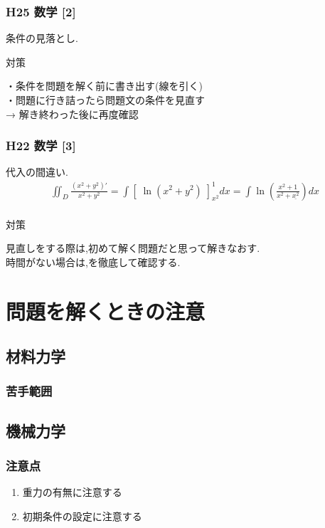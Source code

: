 \documentclass[a4paper]{jsarticle}
\begin{document}
\subsubsection{H25 数学 [2]}
条件の見落とし.
\begin{itembox}[l]{対策}
    \begin{center}
        ・条件を問題を解く前に書き出す(線を引く)\\
        ・問題に行き詰ったら問題文の条件を見直す\\
        → 解き終わった後に再度確認
    \end{center}
\end{itembox}
\subsubsection{H22 数学 [3]}
代入の間違い.
\begin{eqnarray*}
    \iint _D \frac{\left(x^2 + y^2 \right)'}{x^2+y^2}
    = \int \left[\;\ln \left(x^2+y^2\right)\;\right]^1_{x^2} dx
    = \int \ln \left(\frac{x^2 + 1}{x^2 + \underline{x^2}}\right) dx\\
\end{eqnarray*}
\begin{itembox}[l]{対策}
    \begin{center}
        見直しをする際は,初めて解く問題だと思って解きなおす.\\
        時間がない場合は,を徹底して確認する.
    \end{center}
\end{itembox}
\newpage
\section{問題を解くときの注意}
\subsection{材料力学}
\subsubsection{苦手範囲}
\subsection{機械力学}
\subsubsection{注意点}
\begin{enumerate}[(1)]
    \item 重力の有無に注意する
    \item 初期条件の設定に注意する
\end{enumerate}
\end{document}
